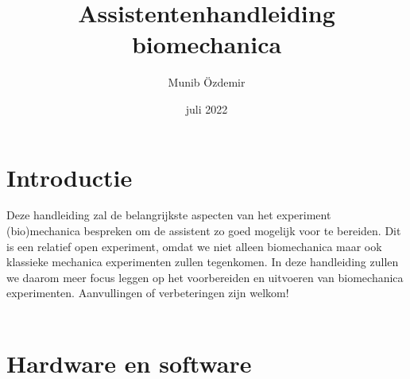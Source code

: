 \documentclass{article}
\title{Assistentenhandleiding biomechanica}
\author{Munib Özdemir}
\date{juli 2022}
\begin{document}
\maketitle

\section{Introductie}
Deze handleiding zal de belangrijkste aspecten van het experiment (bio)mechanica bespreken om de assistent zo goed mogelijk voor te bereiden. Dit is een relatief open experiment, omdat we niet alleen biomechanica maar ook klassieke mechanica experimenten zullen tegenkomen. In deze handleiding zullen we daarom meer focus leggen op het voorbereiden en uitvoeren van biomechanica experimenten. Aanvullingen of verbeteringen zijn welkom!
\\\\

\section{Hardware en software}
\end{document}
